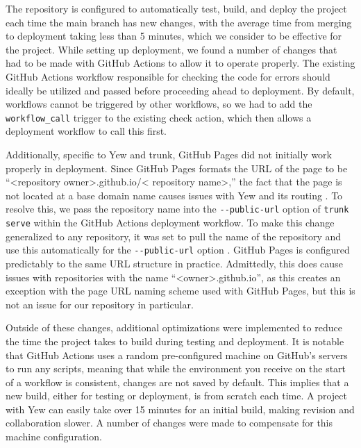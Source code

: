 \documentclass[
    paper=letter,
    parskip=half,
    fontsize=12pt,
    titlepage=firstiscover,
    toc=bibliography,
    numbers=endperiod
]{scrartcl}
\begin{document}
The repository is configured \cite{actions-gh-pages} to automatically
test, build, and deploy the project each time the main branch has new
changes, with the average time from merging to deployment taking less
than 5 minutes, which we consider to be effective for the project. While
setting up deployment, we found a number of changes that had to be made
with GitHub Actions to allow it to operate properly. The existing GitHub
Actions workflow responsible for checking the code for errors should
ideally be utilized and passed before proceeding ahead to deployment. By
default, workflows cannot be triggered by other workflows, so we had to
add the \texttt{workflow\_call} trigger to the existing check action,
which then allows a deployment workflow to call this first.

Additionally, specific to Yew and trunk, GitHub Pages did not initially
work properly in deployment. Since GitHub Pages formats the URL of the
page to be ``\textless repository owner\textgreater.github.io/\textless
repository name\textgreater,'' the fact that the page is not located at
a base domain name causes issues with Yew and its routing
\cite{stackoverflow-yew-github-actions}. To resolve this, we pass the
repository name into the \texttt{-\/-public-url} option of \texttt{trunk
    serve} within the GitHub Actions deployment workflow. To make this
change generalized to any repository, it was set to pull the name of the
repository and use this automatically for the \texttt{-\/-public-url}
option \cite{stackoverflow-github-actions-folder-name}. GitHub Pages is
configured predictably to the same URL structure in practice.
Admittedly, this does cause issues with repositories with the name
``\textless owner\textgreater.github.io'', as this creates an exception
with the page URL naming scheme used with GitHub Pages, but this is not
an issue for our repository in particular.

Outside of these changes, additional optimizations were implemented to
reduce the time the project takes to build during testing and
deployment. It is notable that GitHub Actions uses a random
pre-configured machine on GitHub's servers to run any scripts, meaning
that while the environment you receive on the start of a workflow is
consistent, changes are not saved by default. This implies that a new
build, either for testing or deployment, is from scratch each time. A
project with Yew can easily take over 15 minutes for an initial build,
making revision and collaboration slower. A number of changes were made
to compensate for this machine configuration.
\end{document}
